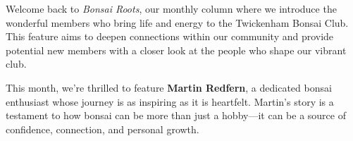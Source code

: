 

\label{2025-04-roots}

\noindent
Welcome back to \textit{Bonsai Roots}, our monthly column where we introduce the wonderful members who bring life and energy to the Twickenham Bonsai Club. This feature aims to deepen connections within our community and provide potential new members with a closer look at the people who shape our vibrant club. 

This month, we're thrilled to feature \textbf{Martin Redfern}, a dedicated bonsai enthusiast whose journey is as inspiring as it is heartfelt. Martin's story is a testament to how bonsai can be more than just a hobby---it can be a source of confidence, connection, and personal growth.

